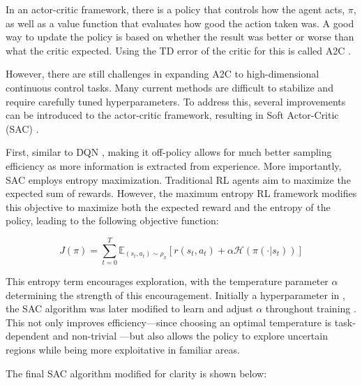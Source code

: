 In an actor-critic framework, there is a policy that controls how the agent acts, $\pi$, as well as a value function that evaluates how good the action taken was. A good way to update the policy is based on whether the result was better or worse than what the critic expected. Using the TD error of the critic for this is called A2C \cite{mnihAsynchronousMethodsDeep2016}.

However, there are still challenges in expanding A2C to high-dimensional continuous control tasks. Many current methods are difficult to stabilize and require carefully tuned hyperparameters. To address this, several improvements can be introduced to the actor-critic framework, resulting in Soft Actor-Critic (SAC) \cite{haarnojaSoftActorCriticOffPolicy2018}.

First, similar to DQN \cite{mnihPlayingAtariDeep2013, mnihHumanlevelControlDeep2015}, making it off-policy allows for much better sampling efficiency as more information is extracted from experience. More importantly, SAC employs entropy maximization. Traditional RL agents aim to maximize the expected sum of rewards. However, the maximum entropy RL framework modifies this objective to maximize both the expected reward and the entropy of the policy, leading to the following objective function:

\begin{equation}
J(\pi) = \sum_{t=0}^{T} \mathbb{E}_{(s_{t}, a_{t}) \sim \rho_{\pi}} \left[ r(s_{t}, a_{t}) + \alpha \mathcal{H}(\pi(\cdot|s_{t})) \right] 
\end{equation}

This entropy term encourages exploration, with the temperature parameter $\alpha$ determining the strength of this encouragement. Initially a hyperparameter in \cite{haarnojaSoftActorCriticOffPolicy2018}, the SAC algorithm was later modified to learn and adjust $\alpha$ throughout training \cite{haarnojaSoftActorCriticAlgorithms2019}. This not only improves efficiency—since choosing an optimal temperature is task-dependent and non-trivial \cite{haarnojaSoftActorCriticAlgorithms2019}—but also allows the policy to explore uncertain regions while being more exploitative in familiar areas.

The final SAC algorithm \cite{haarnojaSoftActorCriticAlgorithms2019} modified for clarity is shown below:

